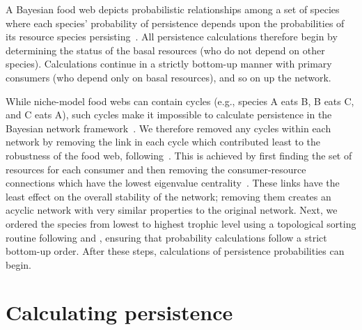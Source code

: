 \documentclass[12pt]{article}
\begin{document}
\begin{spacing}{2.0}
    A Bayesian food web depicts probabilistic relationships among a set of species where each species' probability of persistence depends upon the probabilities of its resource species persisting~\citep{Jensen_Nielsen,Eklof2013}. 
    All persistence calculations therefore begin by determining the status of the basal resources (who do not depend on other species).
    Calculations continue in a strictly bottom-up manner with primary consumers (who depend only on basal resources), and so on up the network.

        
    While niche-model food webs can contain cycles (e.g., species A eats B, B eats C, and C eats A), such cycles make it impossible to calculate persistence in the Bayesian network framework~\citep{Tarjan1972}. 
    We therefore removed any cycles within each network by removing the link in each cycle which contributed least to the robustness of the food web, following~\citet{Allesina2009}.
    This is achieved by first finding the set of resources for each consumer and then removing the consumer-resource connections which have the lowest eigenvalue centrality~\citep{Allesina2009functional}.
    These links have the least effect on the overall stability of the network; removing them creates an acyclic network with very similar properties to the original network.
    Next, we ordered the species from lowest to highest trophic level using a topological sorting routine following \citet{Tarjan1972} and \citet{Allesinaetal2005}, ensuring that probability calculations follow a strict bottom-up order. 
    After these steps, calculations of persistence probabilities can begin.
        
\clearpage

\section{Calculating persistence}        


\end{spacing}
\end{document}
